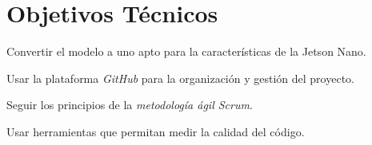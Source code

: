 \section{Objetivos Técnicos}
\begin{list}{\textbullet}{ %
    \addtolength{\itemsep}{-2mm} %
    \setlength{\itemindent}{2mm}}

    \item Convertir el modelo a uno apto para la características de la Jetson Nano.
    \item Usar la plataforma \textit{GitHub} para la organización y gestión del proyecto.
    \item Seguir los principios de la \textit{metodología ágil Scrum}.
    \item Usar herramientas que permitan medir la calidad del código.
\end{list}

